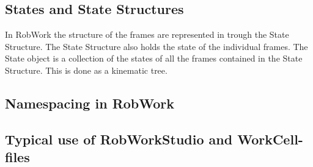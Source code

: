 \subsection{States and State Structures}
In RobWork the structure of the frames are represented in trough the State Structure. The State Structure also holds the state of the individual frames. The State object is a collection of the states of all the frames contained in the State Structure. This is done as a kinematic tree.


\subsection{Namespacing in RobWork}


\subsection{Typical use of RobWorkStudio and WorkCell-files}



